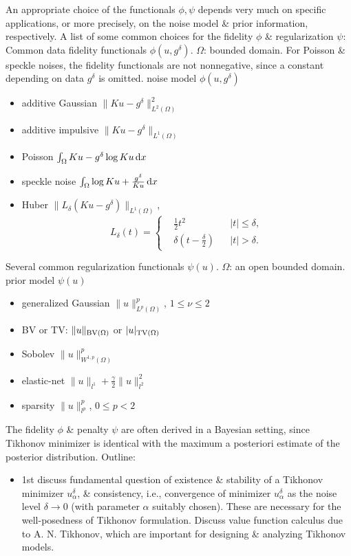 \documentclass{article}
\begin{document}
\begin{enumerate}
\begin{itemize}
		An appropriate choice of the functionals $\phi,\psi$ depends very much on specific applications, or more precisely, on the noise model \& prior information, respectively. A list of some common choices for the fidelity $\phi$ \& regularization $\psi$: {\sf Common data fidelity functionals $\phi(u,g^\delta)$. $\Omega$: bounded domain. For Poisson \& speckle noises, the fidelity functionals are not nonnegative, since a constant depending on data $g^\delta$ is omitted.} noise model $\phi(u,g^\delta)$
		\begin{itemize}
			\item additive Gaussian $\|Ku - g^\delta\|_{L^2(\Omega)}^2$
			\item additive impulsive $\|Ku - g^\delta\|_{L^1(\Omega)}$
			\item Poisson $\int_\Omega Ku - g^\delta\log Ku\,{\rm d}x$
			\item speckle noise $\int_\Omega \log Ku + \frac{g^\delta}{Ku}\,{\rm d}x$
			\item Huber $\|L_\delta(Ku - g^\delta)\|_{L^1(\Omega)}$,
			\begin{equation*}
				L_\delta(t) = \left\{\begin{split}
					&\frac{1}{2}t^2&&|t|\le\delta,\\
					&\delta\left(t - \frac{\delta}{2}\right)&&|t| > \delta.
				\end{split}\right.
			\end{equation*}
		\end{itemize}
		{\sf Several common regularization functionals $\psi(u)$. $\Omega$: an open bounded domain.} prior model $\psi(u)$
		\begin{itemize}
			\item generalized Gaussian $\|u\|_{L^p(\Omega)}^p$, $1\le\nu\le2$
			\item BV or TV: $\|u\|_{{\rm BV}(\Omega)}$ or $|u|_{{\rm TV}(\Omega)}$
			\item Sobolev $\|u\|_{W^{1,p}(\Omega)}^p$
			\item elastic-net $\|u\|_{l^1} + \frac{\gamma}{2}\|u\|_{l^2}^2$
			\item sparsity $\|u\|_{l^p}^p$, $0\le p < 2$
		\end{itemize}
		The fidelity $\phi$ \& penalty $\psi$ are often derived in a Bayesian setting, since Tikhonov minimizer is identical with the maximum a posteriori estimate of the posterior distribution. Outline:
		\begin{itemize}
			\item 1st discuss fundamental question of existence \& stability of a Tikhonov minimizer $u_\alpha^\delta$, \& consistency, i.e., convergence of minimizer $u_\alpha^\delta$ as the noise level $\delta\to0$ (with parameter $\alpha$ suitably chosen). These are necessary for the well-posedness of Tikhonov formulation. Discuss value function calculus due to {\sc A. N. Tikhonov}, which are important for designing \& analyzing Tikhonov models.

\end{itemize}
\end{itemize}
\end{enumerate}
\end{document}
